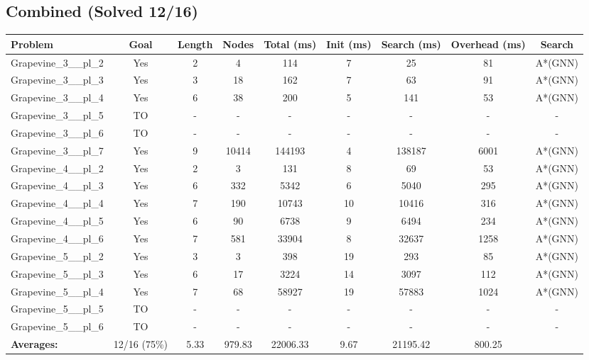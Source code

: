 \documentclass{article}
\begin{document}
\subsection*{Combined (Solved 12/16)}
\begin{tabular}{lcccccccc}
\toprule
Problem & Goal & Length & Nodes & Total (ms) & Init (ms) & Search (ms) & Overhead (ms) & Search \\
\midrule
Grapevine\_3\_\_pl\_2 & Yes & 2 & 4 & 114 & 7 & 25 & 81 & A*(GNN) \\
Grapevine\_3\_\_pl\_3 & Yes & 3 & 18 & 162 & 7 & 63 & 91 & A*(GNN) \\
Grapevine\_3\_\_pl\_4 & Yes & 6 & 38 & 200 & 5 & 141 & 53 & A*(GNN) \\
Grapevine\_3\_\_pl\_5 & TO & - & - & - & - & - & - & - \\
Grapevine\_3\_\_pl\_6 & TO & - & - & - & - & - & - & - \\
Grapevine\_3\_\_pl\_7 & Yes & 9 & 10414 & 144193 & 4 & 138187 & 6001 & A*(GNN) \\
Grapevine\_4\_\_pl\_2 & Yes & 2 & 3 & 131 & 8 & 69 & 53 & A*(GNN) \\
Grapevine\_4\_\_pl\_3 & Yes & 6 & 332 & 5342 & 6 & 5040 & 295 & A*(GNN) \\
Grapevine\_4\_\_pl\_4 & Yes & 7 & 190 & 10743 & 10 & 10416 & 316 & A*(GNN) \\
Grapevine\_4\_\_pl\_5 & Yes & 6 & 90 & 6738 & 9 & 6494 & 234 & A*(GNN) \\
Grapevine\_4\_\_pl\_6 & Yes & 7 & 581 & 33904 & 8 & 32637 & 1258 & A*(GNN) \\
Grapevine\_5\_\_pl\_2 & Yes & 3 & 3 & 398 & 19 & 293 & 85 & A*(GNN) \\
Grapevine\_5\_\_pl\_3 & Yes & 6 & 17 & 3224 & 14 & 3097 & 112 & A*(GNN) \\
Grapevine\_5\_\_pl\_4 & Yes & 7 & 68 & 58927 & 19 & 57883 & 1024 & A*(GNN) \\
Grapevine\_5\_\_pl\_5 & TO & - & - & - & - & - & - & - \\
Grapevine\_5\_\_pl\_6 & TO & - & - & - & - & - & - & - \\
\textbf{Averages:} & 12/16 (75\%) & 5.33 & 979.83 & 22006.33 & 9.67 & 21195.42 & 800.25 & \\
\bottomrule
\end{tabular}
\\[0.7cm]
\end{document}
